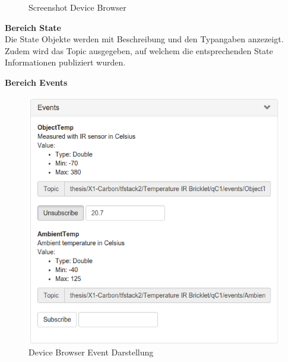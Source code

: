 {\begin{figure}[H]
	\centering
	\caption{Screenshot Device Browser}
\end{figure}


\newpage

\textbf{Bereich State} \\
Die State Objekte werden mit Beschreibung und den Typangaben anzezeigt. Zudem wird das Topic ausgegeben, auf welchem die entsprechenden State Informationen publiziert wurden.


\textbf{Bereich Events}

\begin{figure}[H]
	\centering
        \includegraphics[width=0.7\linewidth]{bilder/device_browser_events.png} 
    \caption{Device Browser Event Darstellung}
\end{figure}

}
